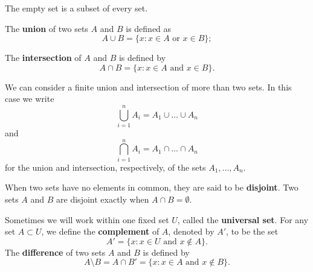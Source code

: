 \begin{remark}
The empty set is a subset of every set.
\end{remark}
\begin{definition}
The \textbf{union} of two sets $A$ and $B$ is defined as
\[
A \cup B = \{x : x \in A \text{ or } x \in B \};
\]
\end{definition}
\begin{definition}
The \textbf{intersection} of $A$ and $B$  is defined by
\[
A \cap B = \{x :  x \in A \text{ and } x \in B \}.
\]
\end{definition}
We can consider a finite union and intersection of more than two sets.  In this case we write
\[
\bigcup_{i = 1}^{n} A_{i} = A_{1} \cup \ldots \cup A_n
\]
and
\[
\bigcap_{i = 1}^{n} A_{i} = A_{1} \cap \ldots \cap A_n
\]
for the union and intersection, respectively, of the sets $A_1, \ldots, A_n$.
\begin{definition}
When two sets have no elements in common, they are said to be \textbf{disjoint}. Two sets $A$ and $B$ are disjoint exactly when $A \cap B = \emptyset$.
\end{definition}
Sometimes we will work within one fixed set $U$, called the \textbf{universal set}.  For any set $A \subset U$, we define the \textbf{complement} of $A$, denoted by $A'$, to be the set
\[
A' = \{ x : x \in U \text{ and } x \notin A \}.
\]
The \textbf{difference} of two sets $A$ and $B$ is defined by
\[
A \setminus B = A \cap B'  = \{ x : x \in A \text{ and } x \notin B \}.
\]

